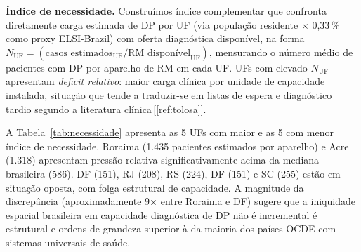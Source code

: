 \documentclass[12pt,a4paper,oneside]{article}
\begin{document}
\textbf{Índice de necessidade.} Construímos índice complementar
que confronta diretamente carga estimada de DP por UF (via
população residente $\times$ 0,33\,\% como proxy ELSI-Brazil) com
oferta diagnóstica disponível, na forma $N_{\text{UF}} =
(\text{casos estimados}_{\text{UF}} / \text{RM disponível}_{\text{UF}})
$, mensurando o número médio de pacientes com DP por aparelho de
RM em cada UF. UFs com elevado $N_{\text{UF}}$ apresentam
\textit{deficit relativo}: maior carga clínica por unidade de
capacidade instalada, situação que tende a traduzir-se em listas
de espera e diagnóstico tardio segundo a literatura
clínica\,[\ref{ref:tolosa}].

A Tabela~\ref{tab:necessidade} apresenta as 5 UFs com maior e as
5 com menor índice de necessidade. Roraima (1.435 pacientes
estimados por aparelho) e Acre (1.318) apresentam pressão
relativa significativamente acima da mediana brasileira (586). DF
(151), RJ (208), RS (224), DF (151) e SC (255) estão em situação
oposta, com folga estrutural de capacidade. A magnitude da
discrepância (aproximadamente 9$\times$ entre Roraima e DF) sugere
que a iniquidade espacial brasileira em capacidade diagnóstica de
DP não é incremental \textemdash{} é estrutural e ordens de
grandeza superior à da maioria dos países OCDE com sistemas
universais de saúde.
\end{document}
